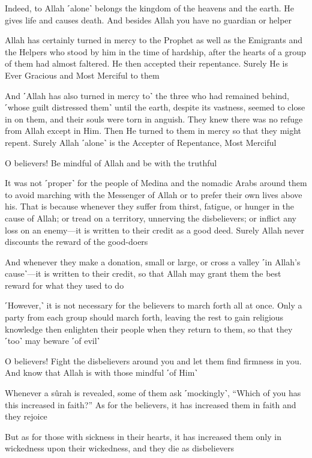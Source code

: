 Indeed, to Allah ˹alone˺ belongs the kingdom of the heavens and the earth. He gives life and causes death. And besides Allah you have no guardian or helper

Allah has certainly turned in mercy to the Prophet as well as the Emigrants and the Helpers who stood by him in the time of hardship, after the hearts of a group of them had almost faltered. He then accepted their repentance. Surely He is Ever Gracious and Most Merciful to them

And ˹Allah has also turned in mercy to˺ the three who had remained behind, ˹whose guilt distressed them˺ until the earth, despite its vastness, seemed to close in on them, and their souls were torn in anguish. They knew there was no refuge from Allah except in Him. Then He turned to them in mercy so that they might repent. Surely Allah ˹alone˺ is the Accepter of Repentance, Most Merciful

O believers! Be mindful of Allah and be with the truthful

It was not ˹proper˺ for the people of Medina and the nomadic Arabs around them to avoid marching with the Messenger of Allah or to prefer their own lives above his. That is because whenever they suffer from thirst, fatigue, or hunger in the cause of Allah; or tread on a territory, unnerving the disbelievers; or inflict any loss on an enemy—it is written to their credit as a good deed. Surely Allah never discounts the reward of the good-doers

And whenever they make a donation, small or large, or cross a valley ˹in Allah’s cause˺—it is written to their credit, so that Allah may grant them the best reward for what they used to do

˹However,˺ it is not necessary for the believers to march forth all at once. Only a party from each group should march forth, leaving the rest to gain religious knowledge then enlighten their people when they return to them, so that they ˹too˺ may beware ˹of evil˺

O believers! Fight the disbelievers around you and let them find firmness in you. And know that Allah is with those mindful ˹of Him˺

Whenever a sûrah is revealed, some of them ask ˹mockingly˺, “Which of you has this increased in faith?” As for the believers, it has increased them in faith and they rejoice

But as for those with sickness in their hearts, it has increased them only in wickedness upon their wickedness, and they die as disbelievers

